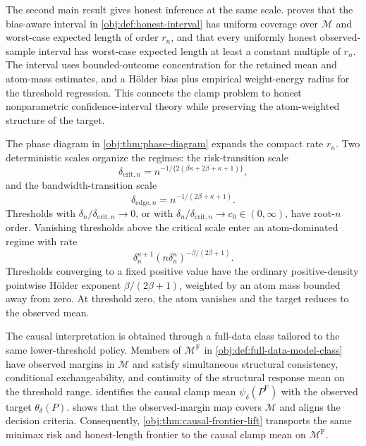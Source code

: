 The second main result gives honest inference at the same scale.  proves that the bias-aware interval in \cref{obj:def:honest-interval} has uniform coverage over \(\mathcal M\) and worst-case expected length of order \(r_n\), and that every uniformly honest observed-sample interval has worst-case expected length at least a constant multiple of \(r_n\). The interval uses bounded-outcome concentration for the retained mean and atom-mass estimates, and a Hölder bias plus empirical weight-energy radius for the threshold regression. This connects the clamp problem to honest nonparametric confidence-interval theory \citep{Low1997NonparametricConfidenceIntervals,ArmstrongKolesar2018OptimalInference,ArmstrongKolesar2020} while preserving the atom-weighted structure of the target.

The phase diagram in \cref{obj:thm:phase-diagram} expands the compact rate \(r_n\). Two deterministic scales organize the regimes: the risk-transition scale
\[
\delta_{\mathrm{crit},n}
=
n^{-1/\{2(\beta\kappa+2\beta+\kappa+1)\}},
\]
and the bandwidth-transition scale
\[
\delta_{\mathrm{edge},n}
=
n^{-1/(2\beta+\kappa+1)}.
\]
Thresholds with \(\delta_n/\delta_{\mathrm{crit},n}\to0\), or with \(\delta_n/\delta_{\mathrm{crit},n}\to c_0\in(0,\infty)\), have root-\(n\) order. Vanishing thresholds above the critical scale enter an atom-dominated regime with rate
\[
\delta_n^{\kappa+1}(n\delta_n^\kappa)^{-\beta/(2\beta+1)}.
\]
Thresholds converging to a fixed positive value have the ordinary positive-density pointwise Hölder exponent \(\beta/(2\beta+1)\), weighted by an atom mass bounded away from zero. At threshold zero, the atom vanishes and the target reduces to the observed mean.

The causal interpretation is obtained through a full-data class tailored to the same lower-threshold policy. Members of \(\mathcal M^{\mathrm F}\) in \cref{obj:def:full-data-model-class} have observed margins in \(\mathcal M\) and satisfy simultaneous structural consistency, conditional exchangeability, and continuity of the structural response mean on the threshold range.  identifies the causal clamp mean \(\psi_\delta(P^{\mathrm F})\) with the observed target \(\theta_\delta(P)\).  shows that the observed-margin map covers \(\mathcal M\) and aligns the decision criteria. Consequently, \cref{obj:thm:causal-frontier-lift} transports the same minimax risk and honest-length frontier to the causal clamp mean on \(\mathcal M^{\mathrm F}\).

